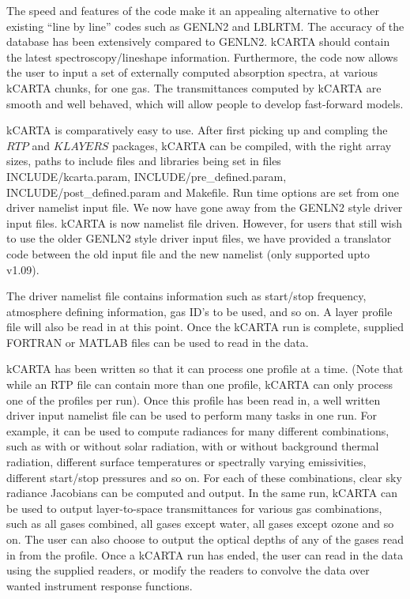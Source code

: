 \documentclass[12pt]{article}
\newcommand{\kc}{\textsf{kCARTA}\xspace}
\begin{document}
The speed and features of the code make it an appealing alternative to other
existing ``line by line'' codes such as {\sf GENLN2} and {\sf LBLRTM}.
The accuracy of the database has been extensively compared to {\sf
  GENLN2}.  \kc should contain the latest spectroscopy/lineshape
information.  Furthermore, the code now allows the user to input a set
of externally computed absorption spectra, at various \kc chunks, for one 
gas. The transmittances computed by \kc are smooth and well behaved, which 
will allow people to develop fast-forward models.

\kc is comparatively easy to use. After first picking up and compling the 
$RTP$ and $KLAYERS$ packages, \kc can be compiled, with the right array sizes,
paths to include files and libraries being set in files 
{\sf INCLUDE/kcarta.param, INCLUDE/pre\_defined.param, 
INCLUDE/post\_defined.param  and Makefile}. 
Run time options are set from one driver namelist input file.  We now have 
gone away from the {\sf GENLN2} style driver input files.
\kc is now namelist file driven. However, for users that still wish to use 
the older {\sf GENLN2} style driver input files, we have provided a 
translator code between the old input file and the new namelist (only 
supported upto v1.09).

The driver namelist file contains information such as
start/stop frequency, atmosphere defining information, gas ID's to
be used, and so on.  A layer profile file will also
be read in at this point.  Once the \kc run is complete, supplied
{\sf FORTRAN} or {\sf MATLAB} files can be used to read in the data.

\kc has been written so that it can process one profile at a time. (Note that
while an RTP file can contain more than one profile, \kc can only process
one of the profiles per run). 
Once this profile has been read in, a well written driver input namelist file
can be used to perform many tasks in one run.  For example, it can be
used to compute radiances for many different combinations, such as
with or without solar radiation, with or without background thermal
radiation, different surface temperatures or spectrally varying
emissivities, different start/stop pressures and so on.  For each of
these combinations, clear sky radiance Jacobians can be computed and output. In
the same run, \kc can be used to output layer-to-space transmittances
for various gas combinations, such as all gases combined, all gases
except water, all gases except ozone and so on.  The user can also
choose to output the optical depths of any of the gases read in from
the profile.  Once a \kc run has ended, the user can read in the data
using the supplied readers, or modify the readers to convolve the data
over wanted instrument response functions.
\end{document}
